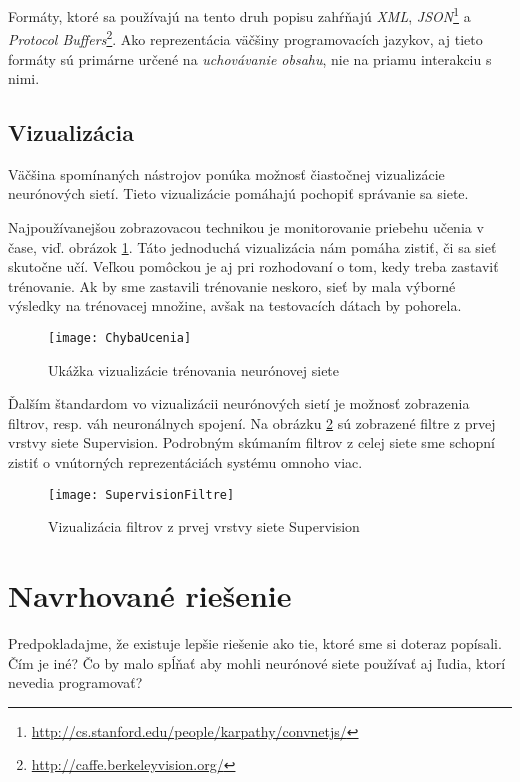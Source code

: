 Formáty, ktoré sa používajú na tento druh popisu zahŕňajú \emph{XML}\autocite{Beran2008}, \emph{JSON}\footnote{\url{http://cs.stanford.edu/people/karpathy/convnetjs/}} a \emph{Protocol Buffers}\footnote{\url{http://caffe.berkeleyvision.org/}}. Ako reprezentácia väčšiny programovacích jazykov, aj tieto formáty sú primárne určené na \emph{uchovávanie obsahu}, nie na priamu interakciu s nimi.

\subsection{Vizualizácia}

Väčšina spomínaných nástrojov ponúka možnosť čiastočnej vizualizácie neurónových sietí. Tieto vizualizácie pomáhajú pochopiť správanie sa siete.

Najpoužívanejšou zobrazovacou technikou je monitorovanie priebehu učenia v čase, viď. obrázok \ref{fig:ChybaUcenia}. Táto jednoduchá vizualizácia nám pomáha zistiť, či sa sieť skutočne učí. Veľkou pomôckou je aj pri rozhodovaní o tom, kedy treba zastaviť trénovanie. Ak by sme zastavili trénovanie neskoro, sieť by mala výborné výsledky na trénovacej množine, avšak na testovacích dátach by pohorela.

\begin{figure}
  \centering
  \texttt{[image: ChybaUcenia]}
  \caption{Ukážka vizualizácie trénovania neurónovej siete}
  \label{fig:ChybaUcenia}
\end{figure}

Ďalším štandardom vo vizualizácii neurónových sietí je možnosť zobrazenia filtrov, resp. váh neuronálnych spojení. Na obrázku \ref{fig:SupervisionFiltre} sú zobrazené filtre z prvej vrstvy siete Supervision.\autocite{Krizhevsky2012} Podrobným skúmaním filtrov z celej siete sme schopní zistiť o vnútorných reprezentáciách systému omnoho viac.\autocite{Zeiler2013}

\begin{figure}
  \centering
  \texttt{[image: SupervisionFiltre]}
  \caption{Vizualizácia filtrov z prvej vrstvy siete Supervision}
  \label{fig:SupervisionFiltre}
\end{figure}


\section{Navrhované riešenie}

Predpokladajme, že existuje lepšie riešenie ako tie, ktoré sme si doteraz popísali. Čím je iné? Čo by malo spĺňať aby mohli neurónové siete používať aj ľudia, ktorí nevedia programovať?

